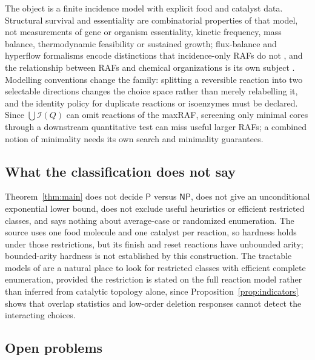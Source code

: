 \documentclass[11pt,a4paper]{article}
\theoremstyle{plain}
\theoremstyle{definition}
\theoremstyle{remark}
\newcommand{\Irr}{\mathcal I}
\newcommand{\PP}{\mathsf P}
\newcommand{\NP}{\mathsf{NP}}
\begin{document}
The object is a finite incidence model with explicit food and catalyst data. Structural survival and essentiality are combinatorial properties of that model, not measurements of gene or organism essentiality, kinetic frequency, mass balance, thermodynamic feasibility or sustained growth; flux-balance and hyperflow formalisms encode distinctions that incidence-only RAFs do not \cite{orth2010flux,andersen2021defining}, and the relationship between RAFs and chemical organizations is its own subject \cite{hordijk2018organizations}. Modelling conventions change the family: splitting a reversible reaction into two selectable directions changes the choice space rather than merely relabelling it, and the identity policy for duplicate reactions or isoenzymes must be declared. Since $\bigcup\Irr(Q)$ can omit reactions of the maxRAF, screening only minimal cores through a downstream quantitative test can miss useful larger RAFs; a combined notion of minimality needs its own search and minimality guarantees.

\subsection{What the classification does not say}

Theorem~\ref{thm:main} does not decide $\PP$ versus $\NP$, does not give an unconditional exponential lower bound, does not exclude useful heuristics or efficient restricted classes, and says nothing about average-case or randomized enumeration. The source uses one food molecule and one catalyst per reaction, so hardness holds under those restrictions, but its finish and reset reactions have unbounded arity; bounded-arity hardness is not established by this construction. The tractable models of \cite{steel2018tractable} are a natural place to look for restricted classes with efficient complete enumeration, provided the restriction is stated on the full reaction model rather than inferred from catalytic topology alone, since Proposition~\ref{prop:indicators} shows that overlap statistics and low-order deletion responses cannot detect the interacting choices.

\subsection{Open problems}
\end{document}
